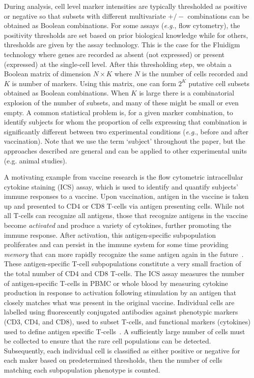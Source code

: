\documentclass[useAMS,referee,usenatbib]{biom}
\begin{document}
During analysis, cell level marker intensities are typically thresholded as positive or negative so that subsets with different multivariate $+/-$ combinations can be obtained as Boolean combinations. 
For some assays (\textit{e.g.}, flow cytometry), the positivity thresholds are set based on prior biological knowledge while for others, thresholds are given by the assay technology. 
This is the case for the Fluidigm technology where genes are recorded as absent (not expressed) or present (expressed) at the single-cell level.
 After this thresholding step, we obtain a Boolean matrix of dimension $N\times K$ where $N$ is the number of cells recorded and $K$ is number of markers. 
Using this matrix, one can form $2^K$ putative cell subsets obtained as Boolean combinations. 
When $K$ is large there is a combinatorial explosion of the number of subsets, and many of these might be small or even empty. 
A common statistical problem is, for a given marker combination, to identify subjects for whom the proportion of cells expressing that combination is significantly different between two experimental conditions (\textit{e.g.}, before and after vaccination). Note that we use the term `subject' throughout the paper, but the approaches described are general and can be applied to other experimental units (e.g. animal studies).

A motivating example from vaccine research is the flow cytometric intracellular cytokine staining (ICS) assay, which is used to identify and quantify subjects' immune responses to a vaccine. Upon vaccination, antigen in the vaccine is taken up and presented to CD4 or CD8 T-cells via antigen presenting cells.
 While not all T-cells can recognize all antigens, those that recognize antigens in the vaccine become \emph{activated} and produce a variety of cytokines, further promoting the immune response. 
 After activation, this antigen-specific subpopulation proliferates and can persist in the immune system for some time providing \emph{memory} that can more rapidly recognize the same antigen again in the future~\citep{McKinstry:2010ei}. These antigen-specific T-cell subpopulations constitute a very small fraction of the total number of CD4 and CD8 T-cells. The ICS assay measures the number of antigen-specific T-cells in PBMC or whole blood by measuring cytokine production in response to activation following stimulation by an antigen that closely matches what was present in the original vaccine. 
Individual cells are labelled using fluorescently conjugated antibodies against phenotypic markers (CD3, CD4, and CD8), used to subset T-cells, and functional markers (cytokines) used to define antigen specific T-cells~\citep{Horton:2007tsa,DeRosa:2004wp,Betts:2006dw}.
A sufficiently large number of cells must be collected to ensure that the rare cell populations can be detected. 
Subsequently, each individual cell is classified as either positive or negative for each maker based on predetermined thresholds, then the number of cells matching each subpopulation phenotype is counted. 
\end{document}
